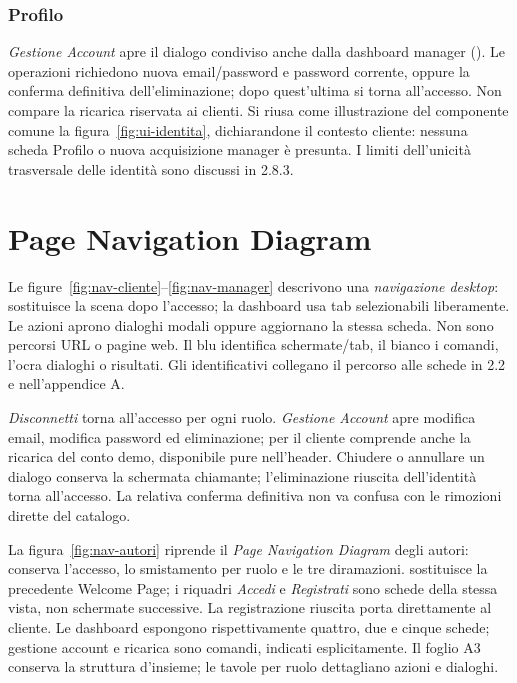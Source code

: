 \subsubsection{Profilo}
\emph{Gestione Account} apre il dialogo condiviso anche dalla dashboard
manager (). Le operazioni richiedono
nuova email/password e password corrente, oppure la conferma definitiva
dell'eliminazione; dopo quest'ultima si torna all'accesso. Non compare
la ricarica riservata ai clienti. Si riusa come illustrazione del componente
comune la figura~\ref{fig:ui-identita}, dichiarandone il contesto cliente:
nessuna scheda Profilo o nuova acquisizione manager è presunta. I limiti
dell'unicità trasversale delle identità sono discussi in 2.8.3.
\clearpage

\section{Page Navigation Diagram}\label{sec:navigazione}
Le figure~\ref{fig:nav-cliente}--\ref{fig:nav-manager} descrivono una
\emph{navigazione desktop}:  sostituisce la scena dopo l'accesso;
la dashboard usa tab selezionabili liberamente. Le azioni aprono dialoghi
modali oppure aggiornano la stessa scheda. Non sono percorsi URL o pagine web.
Il blu identifica schermate/tab, il bianco i comandi, l'ocra dialoghi o
risultati. Gli identificativi collegano il percorso alle schede in 2.2 e nell'appendice A.

\emph{Disconnetti} torna all'accesso per ogni ruolo. \emph{Gestione Account}
apre modifica email, modifica password ed eliminazione; per il cliente
comprende anche la ricarica del conto demo, disponibile pure nell'header.
Chiudere o annullare un dialogo conserva la schermata chiamante;
l'eliminazione riuscita dell'identit\`a torna all'accesso.
La relativa conferma definitiva non va confusa con le rimozioni dirette del catalogo.

La figura~\ref{fig:nav-autori} riprende il \emph{Page Navigation Diagram}
degli autori: conserva l'accesso, lo smistamento per ruolo e le tre diramazioni.
 sostituisce la precedente Welcome Page; i riquadri
\emph{Accedi} e \emph{Registrati} sono schede della stessa vista, non
schermate successive. La registrazione riuscita porta direttamente al cliente.
Le dashboard espongono rispettivamente quattro, due e cinque schede;
gestione account e ricarica sono comandi, indicati esplicitamente.
Il foglio A3 conserva la struttura d'insieme; le tavole per ruolo dettagliano
azioni e dialoghi.

